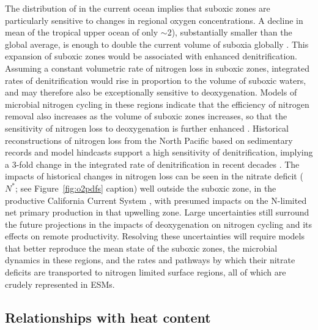 \documentclass{report_chapter}
\begin{document}
The distribution of \OO{} in the current ocean implies that suboxic zones are particularly sensitive to changes in regional oxygen concentrations.
A decline in mean \OO{} of the tropical upper ocean of only $\sim$2\mmolmmm{}), substantially smaller than the global average,  is enough to double the current volume of suboxia globally \citep{Deutsch-Berelson-etal-2014}.
This expansion of suboxic zones would be associated with enhanced denitrification.
Assuming a constant volumetric rate of nitrogen loss in suboxic zones, integrated rates of denitrification would rise in proportion to the volume of suboxic waters, and may therefore also be exceptionally sensitive to deoxygenation.
Models of microbial nitrogen cycling in these regions indicate that the efficiency of nitrogen removal also increases as the volume of suboxic zones increases, so that the sensitivity of nitrogen loss to deoxygenation is further enhanced \citep{Penn-Weber-etal-2016}.
Historical reconstructions of nitrogen loss from the North Pacific based on sedimentary records and model hindcasts support a high sensitivity of denitrification, implying a 3-fold change in the integrated rate of denitrification in recent decades \citep{Deutsch-Berelson-etal-2014,Yang-Gruber-etal-2016}.
The impacts of historical changes in nitrogen loss can be seen in the nitrate deficit ($N^*$; see Figure~\ref{fig:o2pdfs} caption) well outside the suboxic zone, in the productive California Current System \citep{Deutsch-Brix-etal-2011}, with presumed impacts on the N-limited net primary production in that upwelling zone.
Large uncertainties still surround the future projections in the impacts of deoxygenation on nitrogen cycling and its effects on remote productivity.
Resolving these uncertainties will require models that better reproduce the mean state of the suboxic zones, the microbial dynamics in these regions, and the rates and pathways by which their nitrate deficits are transported to nitrogen limited surface regions, all of which are crudely represented in ESMs.

\subsection{Relationships with heat content}
\end{document}
